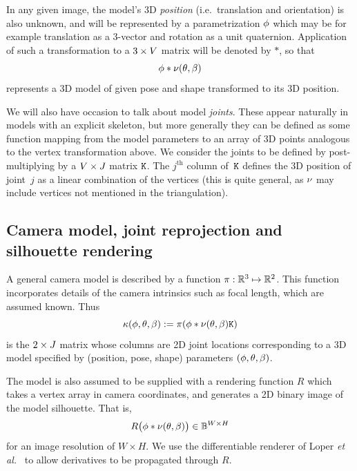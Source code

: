 In any given image, the model's 3D {\em position} (i.e.\ translation and orientation) is also unknown, and will be represented by a parametrization $\phi$ which may be for example translation as a 3-vector and rotation as a unit quaternion. Application of such a transformation to a $3\times V$ matrix will be denoted by $*$, so that 
\begin{equation}
\phi * \nu(\theta, \beta)
\end{equation}
represents a 3D model of given pose and shape transformed to its 3D position.

We will also have occasion to talk about model {\em joints}.  These appear naturally in models with an explicit skeleton, but more generally they can be defined as some function mapping from the model parameters to an array of 3D points analogous to the vertex transformation above.  We consider the joints to be defined by post-multiplying by a $V \times J$ matrix $\mathtt{K}$.  The $j^{\text{th}}$ column of~$\mathtt{K}$ defines the 3D position of joint~$j$ as a linear combination of the vertices (this is quite general, as $\nu$ may include vertices not mentioned in the triangulation).  

\subsection{Camera model, joint reprojection and silhouette rendering}
A general camera model is described by a function $\pi: {\mathbb{R}^{3}} \mapsto {\mathbb{R}^{2}}$.  This function incorporates details of the camera intrinsics such as focal length, which are assumed known.  
Thus 
\begin{equation}
\kappa(\phi, \theta, \beta) := \pi(\phi * \nu(\theta, \beta) \mathtt{K})
\end{equation}
is the $2\times J$ matrix whose columns are 2D joint locations corresponding to a 3D model specified by (position, pose, shape) parameters $(\phi, \theta, \beta)$.

The model is also assumed to be supplied with a rendering function $R$ which takes a vertex array in camera coordinates, and generates a 2D binary image of the model silhouette.  That is,
\begin{equation}
R\bigl(\phi * \nu(\theta, \beta)\bigr) \in \mathbb{B}^{W\times H}
\end{equation}
for an image resolution of $W \times H$.  We use the differentiable renderer of Loper {\em et al.}~\cite{loper2014opendr} to allow derivatives to be propagated through $R$.  


